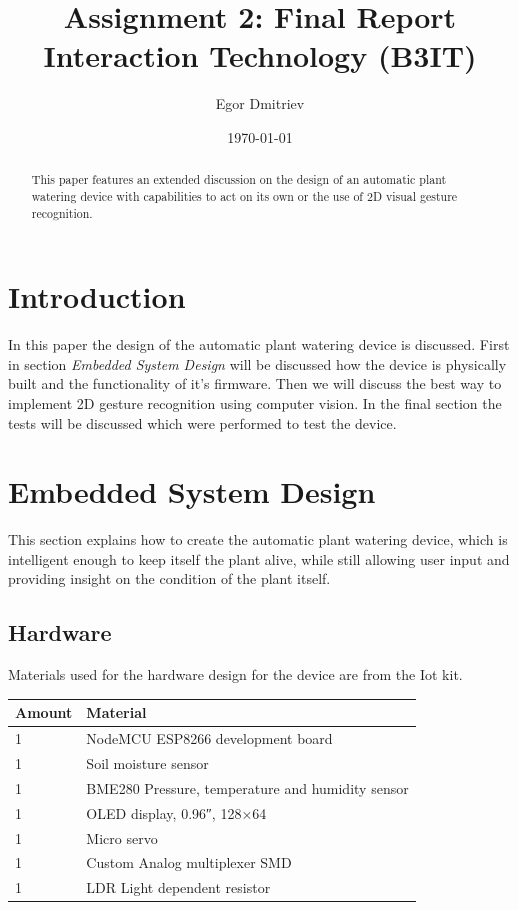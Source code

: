 \documentclass[11pt,a4paper]{article}
\title{Assignment 2: Final Report \\ \large Interaction Technology (B3IT)}
\author{Egor Dmitriev}
\date{\today}
\begin{document}
\maketitle

\begin{abstract}
This paper features an extended discussion on the design of an automatic plant watering device with capabilities to act on its own or the use of 2D visual gesture recognition.
\end{abstract}
\newpage

\tableofcontents
\newpage

\section{Introduction}
In this paper the design of the automatic plant watering device is discussed. First in section \textit{Embedded System Design} will be discussed how the device is physically built and the functionality of it's firmware. Then we will discuss the best way to implement 2D gesture recognition using computer vision. In the final section the tests will be discussed which were performed to test the device.

\section{Embedded System Design}
This section explains how to create the automatic plant watering device, which is intelligent enough to keep itself the plant alive, while still allowing user input and providing insight on the condition of the plant itself.

\subsection{Hardware}
Materials used for the hardware design for the device are from the Iot kit.

\begin{center}
\begin{tabular}{ |l|l| } 
\hline
Amount & Material \\
\hline
1 & NodeMCU ESP8266 development board \\ 
1 & Soil moisture sensor \\ 
1 & BME280 Pressure, temperature and humidity sensor \\ 
1 & OLED display, 0.96″, 128×64 \\
1 & Micro servo \\
1 & Custom Analog multiplexer SMD \\
1 & LDR Light dependent resistor \\
\hline
\end{tabular}
\end{center}
\bigskip
\end{document}
